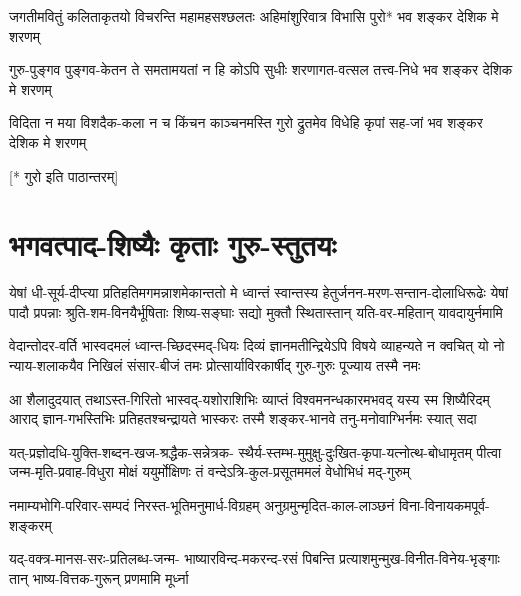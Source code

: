 \twolineshloka
{जगतीमवितुं कलिताकृतयो विचरन्ति महामहसश्छलतः}
{अहिमांशुरिवात्र विभासि पुरो* भव शङ्कर देशिक मे शरणम्}

\twolineshloka
{गुरु-पुङ्गव पुङ्गव-केतन ते समतामयतां न हि कोऽपि सुधीः}
{शरणागत-वत्सल तत्त्व-निधे भव शङ्कर देशिक मे शरणम्}

\twolineshloka
{विदिता न मया विशदैक-कला न च किंचन काञ्चनमस्ति गुरो}
{द्रुतमेव विधेहि कृपां सह-जां भव शङ्कर देशिक मे शरणम्}

{\normalsize[* गुरो इति पाठान्तरम्]}


\section{भगवत्पाद-शिष्यैः कृताः गुरु-स्तुतयः}

\fourlineindentedshloka
{येषां धी-सूर्य-दीप्त्या प्रतिहतिमगमन्नाशमेकान्ततो मे}
{ध्वान्तं स्वान्तस्य हेतुर्जनन-मरण-सन्तान-दोलाधिरूढेः}
{येषां पादौ प्रपन्नाः श्रुति-शम-विनयैर्भूषिताः शिष्य-सङ्घाः}
{सद्यो मुक्तौ स्थितास्तान् यति-वर-महितान् यावदायुर्नमामि}


\fourlineindentedshloka
{वेदान्तोदर-वर्ति भास्वदमलं ध्वान्त-च्छिदस्मद्-धियः}
{दिव्यं ज्ञानमतीन्द्रियेऽपि विषये व्याहन्यते न क्वचित्}
{यो नो न्याय-शलाकयैव निखिलं संसार-बीजं तमः}
{प्रोत्सार्याविरकार्षीद् गुरु-गुरुः पूज्याय तस्मै नमः}


\fourlineindentedshloka
{आ शैलादुदयात् तथाऽस्त-गिरितो भास्वद्-यशोराशिभिः}
{व्याप्तं विश्वमनन्धकारमभवद् यस्य स्म शिष्यैरिदम्}
{आराद् ज्ञान-गभस्तिभिः प्रतिहतश्चन्द्रायते भास्करः}
{तस्मै शङ्कर-भानवे तनु-मनोवाग्भिर्नमः स्यात् सदा}

\fourlineindentedshloka
{यत्-प्रज्ञोदधि-युक्ति-शब्दन-खज-श्रद्धैक-सन्नेत्रक-}
{स्थैर्य-स्तम्भ-मुमुक्षु-दुःखित-कृपा-यत्नोत्थ-बोधामृतम्}
{पीत्वा जन्म-मृति-प्रवाह-विधुरा मोक्षं ययुर्मोक्षिणः}
{तं वन्देऽत्रि-कुल-प्रसूतममलं वेधोभिधं मद्-गुरुम्}


\twolineshloka
{नमाम्यभोगि-परिवार-सम्पदं निरस्त-भूतिमनुमार्ध-विग्रहम्}
{अनुग्रमुन्मृदित-काल-लाञ्छनं विना-विनायकमपूर्व-शङ्करम्}

\fourlineindentedshloka
{यद्-वक्त्र-मानस-सरः-प्रतिलब्ध-जन्म-}
{भाष्यारविन्द-मकरन्द-रसं पिबन्ति}
{प्रत्याशमुन्मुख-विनीत-विनेय-भृङ्गाः}
{तान् भाष्य-वित्तक-गुरून् प्रणमामि मूर्ध्ना}

